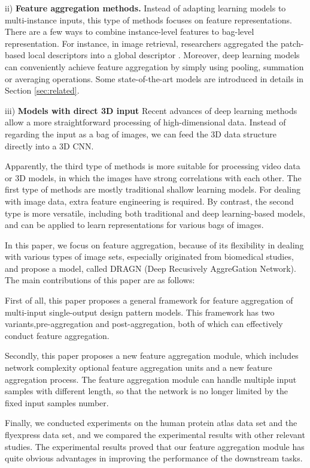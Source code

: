 \documentclass[10pt,twocolumn,letterpaper]{article}
\begin{document}
  
ii) \textbf{Feature aggregation methods.}
Instead of adapting learning models to multi-instance inputs, this type of methods focuses on feature representations. There are a few ways to combine instance-level features to bag-level representation. For instance, in image retrieval, researchers aggregated the patch-based local descriptors into a global descriptor \cite{bov, perronnin2010improving, arandjelovic2013all}. Moreover, deep learning models can conveniently achieve feature aggregation by simply using pooling, summation or averaging operations. Some state-of-the-art models are introduced in details in Section \ref{sec:related}.

iii) \textbf{Models with direct 3D input}
Recent advances of deep learning methods allow a more straightforward processing of high-dimensional data. Instead of regarding the input as a bag of images, we can feed the 3D data structure directly into a 3D CNN. 


Apparently, the third type of methods is more suitable for processing video data or 3D models, in which the images have strong correlations with each other. The first type of methods are mostly traditional shallow learning models. For dealing with image data, extra feature engineering is required. By contrast, the second type is more versatile, including both traditional and deep learning-based models, and can be applied to learn representations for various bags of images.

In this paper, we focus on feature aggregation, because of its flexibility in dealing with various types of image sets, especially originated from biomedical studies, and propose a model, called DRAGN (Deep Recusively AggreGation Network). The main contributions of this paper are as follows:

First of all, this paper proposes a general framework for feature aggregation of multi-input single-output design pattern models. This framework has two variants,pre-aggregation and post-aggregation, both of which can effectively conduct feature aggregation.

Secondly, this paper proposes a new feature aggregation module, which includes network complexity optional feature aggregation units and a new feature aggregation process. The feature aggregation module can handle multiple input samples with different length, so that the network is no longer limited by the fixed input samples number.

Finally, we conducted experiments on the human protein atlas data set and the flyexpress data set, and we compared the experimental results with other relevant studies. The experimental results proved that our feature aggregation module has quite obvious advantages in improving the performance of the downstream tasks.
\end{document}
